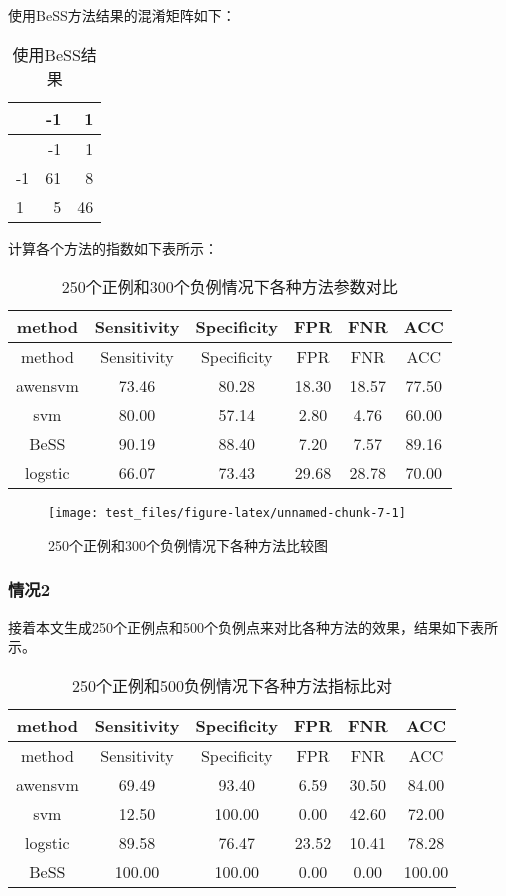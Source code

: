 \documentclass[
]{ctexart}
\begin{document}
使用BeSS方法结果的混淆矩阵如下：

\begin{longtable}[]{@{}lrr@{}}
\caption{使用BeSS结果}\tabularnewline
\toprule
& -1 & 1 \\
\midrule
\endfirsthead
\toprule
& -1 & 1 \\
\midrule
\endhead
-1 & 61 & 8 \\
1 & 5 & 46 \\
\bottomrule
\end{longtable}

计算各个方法的指数如下表所示：

\begin{longtable}[]{@{}cccccc@{}}
\caption{250个正例和300个负例情况下各种方法参数对比}\tabularnewline
\toprule
method & Sensitivity & Specificity & FPR & FNR & ACC \\
\midrule
\endfirsthead
\toprule
method & Sensitivity & Specificity & FPR & FNR & ACC \\
\midrule
\endhead
awensvm & 73.46 & 80.28 & 18.30 & 18.57 & 77.50 \\
svm & 80.00 & 57.14 & 2.80 & 4.76 & 60.00 \\
BeSS & 90.19 & 88.40 & 7.20 & 7.57 & 89.16 \\
logstic & 66.07 & 73.43 & 29.68 & 28.78 & 70.00 \\
\bottomrule
\end{longtable}

\begin{figure}
\texttt{[image: test\_files/figure-latex/unnamed-chunk-7-1]} \caption{250个正例和300个负例情况下各种方法比较图}\label{fig:unnamed-chunk-7}
\end{figure}

\hypertarget{ux60c5ux51b52}{%
\subsubsection{情况2}\label{ux60c5ux51b52}}

接着本文生成250个正例点和500个负例点来对比各种方法的效果，结果如下表所示。

\begin{longtable}[]{@{}cccccc@{}}
\caption{250个正例和500负例情况下各种方法指标比对}\tabularnewline
\toprule
method & Sensitivity & Specificity & FPR & FNR & ACC \\
\midrule
\endfirsthead
\toprule
method & Sensitivity & Specificity & FPR & FNR & ACC \\
\midrule
\endhead
awensvm & 69.49 & 93.40 & 6.59 & 30.50 & 84.00 \\
svm & 12.50 & 100.00 & 0.00 & 42.60 & 72.00 \\
logstic & 89.58 & 76.47 & 23.52 & 10.41 & 78.28 \\
BeSS & 100.00 & 100.00 & 0.00 & 0.00 & 100.00 \\
\bottomrule
\end{longtable}
\end{document}
